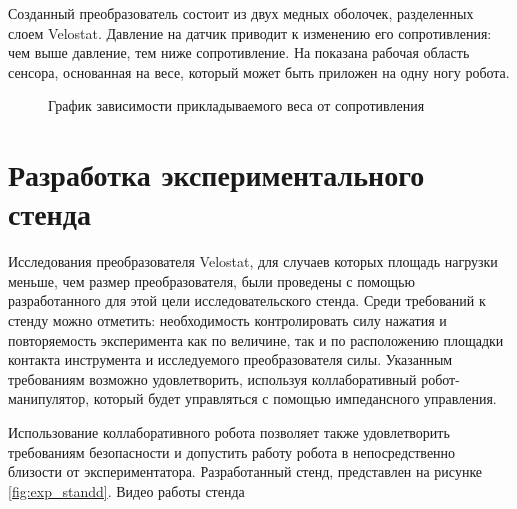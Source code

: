 Созданный преобразователь состоит из двух медных оболочек, разделенных слоем Velostat. Давление на датчик приводит к изменению его сопротивления: чем выше давление, тем ниже сопротивление. На  показана рабочая область сенсора, основанная на весе, который может быть приложен на одну ногу робота.
\begin{figure}[h]
    \centering
    \caption{График зависимости прикладываемого веса от сопротивления}
    \label{fig:velostat_pressure_resistance.jpg}
\end{figure}

\section{Разработка экспериментального стенда}

Исследования преобразователя Velostat, для случаев которых площадь нагрузки меньше, чем размер преобразователя, были проведены с помощью разработанного для этой цели исследовательского стенда. Среди требований к стенду можно отметить: необходимость контролировать силу нажатия и повторяемость эксперимента как по величине, так и по расположению площадки контакта инструмента и исследуемого преобразователя силы. Указанным требованиям возможно удовлетворить, используя коллаборативный робот-манипулятор, который будет управляться с помощью импедансного управления.

Использование коллаборативного робота позволяет также удовлетворить требованиям безопасности и допустить работу робота в непосредственно близости от экспериментатора. Разработанный стенд, представлен на рисунке \ref{fig:exp_standd}. Видео работы стенда \quad {}

